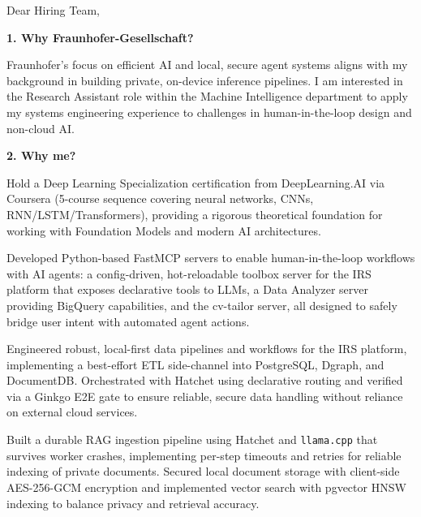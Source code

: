 \documentclass[11pt,a4paper]{coverletter}
\begin{document}

\opening{Dear Hiring Team,}

\vspace{8pt}\noindent\textbf{1. Why Fraunhofer-Gesellschaft?}\par\vspace{3pt}

Fraunhofer's focus on efficient AI and local, secure agent systems aligns with my background in building private, on-device inference pipelines. I am interested in the Research Assistant role within the Machine Intelligence department to apply my systems engineering experience to challenges in human-in-the-loop design and non-cloud AI.

\vspace{8pt}\noindent\textbf{2. Why me?}\par\vspace{3pt}

\bullets

  \item Hold a Deep Learning Specialization certification from DeepLearning.AI via Coursera (5-course sequence covering neural networks, CNNs, RNN/LSTM/Transformers), providing a rigorous theoretical foundation for working with Foundation Models and modern AI architectures.

  \item Developed Python-based FastMCP servers to enable human-in-the-loop workflows with AI agents: a config-driven, hot-reloadable toolbox server for the IRS platform that exposes declarative tools to LLMs, a Data Analyzer server providing BigQuery capabilities, and the cv-tailor server, all designed to safely bridge user intent with automated agent actions.

  \item Engineered robust, local-first data pipelines and workflows for the IRS platform, implementing a best-effort ETL side-channel into PostgreSQL, Dgraph, and DocumentDB. Orchestrated with Hatchet using declarative routing and verified via a Ginkgo E2E gate to ensure reliable, secure data handling without reliance on external cloud services.

  \item Built a durable RAG ingestion pipeline using Hatchet and \texttt{llama.cpp} that survives worker crashes, implementing per-step timeouts and retries for reliable indexing of private documents. Secured local document storage with client-side AES-256-GCM encryption and implemented vector search with pgvector HNSW indexing to balance privacy and retrieval accuracy.
\end{document}
